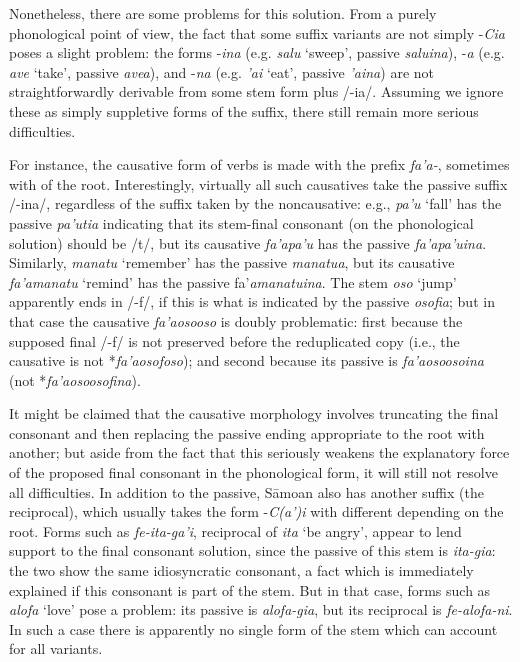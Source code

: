 Nonetheless, there are some problems for this solution. From a purely
phonological point of view, the fact that some suffix variants are not
simply -\emph{Cia} poses a slight problem: the forms -\emph{ina}
(e.g. \emph{salu} `sweep', passive \emph{saluina}), -\emph{a}
(e.g. \emph{ave} `take', passive \emph{avea}), and -\emph{na}
(e.g. \emph{'ai} `eat', passive \emph{'aina}) are not
straightforwardly derivable from some stem form plus /-ia/. Assuming
we ignore these as simply suppletive forms of the suffix, there still
remain more serious difficulties.

For instance, the causative form of verbs is made with the prefix
\emph{fa'a-}, sometimes with  of the root. Interestingly,
virtually all such causatives take the passive suffix /-ina/,
regardless of the suffix taken by the noncausative: e.g., \emph{pa'u}
`fall' has the passive \emph{pa'utia} indicating that its stem-final
consonant (on the phonological solution) should be /t/, but its
causative \emph{fa'apa'u} has the passive
\emph{fa'apa'uina}. Similarly, \emph{manatu} `remember' has the
passive \emph{manatua}, but its causative\emph{ fa'amanatu} `remind'
has the passive fa'\emph{amanatuina}. The stem \emph{oso} `jump'
apparently ends in /-f/, if this is what is indicated by the passive
\emph{osofia}; but in that case the causative \emph{fa'aosooso} is
doubly problematic: first because the supposed final /-f/ is not
preserved before the reduplicated copy (i.e., the causative is not
*\emph{fa'aosofoso}); and second because its passive is
\emph{fa'aosoosoina} (not *\emph{fa'aosoosofina}).

It might be claimed that the causative morphology involves truncating
the final consonant and then replacing the passive ending appropriate
to the root with another; but aside from the fact that this seriously
weakens the explanatory force of the proposed final consonant in the
phonological form, it will still not resolve all difficulties. In
addition to the passive, Sāmoan also has another suffix (the
reciprocal), which usually takes the form -\emph{C(a')i} with
different  depending on the root. Forms such as
\emph{fe-ita-ga'i}, reciprocal of \emph{ita} `be angry', appear to
lend support to the final consonant solution, since the passive of
this stem is \emph{ita-gia}: the two show the same idiosyncratic
consonant, a fact which is immediately explained if this consonant is
part of the stem. But in that case, forms such as \emph{alofa} `love'
pose a problem: its passive is \emph{alofa-gia}, but its reciprocal is
\emph{fe-alofa-ni}. In such a case there is apparently no single form
of the stem which can account for all variants.

